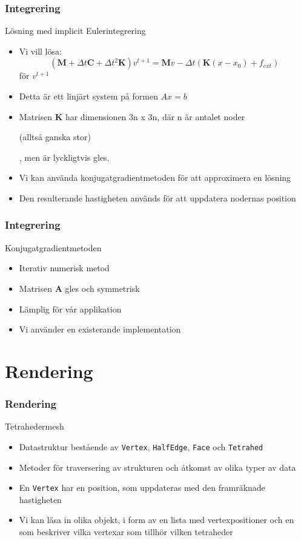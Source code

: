 \documentclass{beamer}
\begin{document}
\begin{frame}
\frametitle{Integrering}
\begin{block}{Lösning med implicit Eulerintegrering}
\begin{itemize}
\item Vi vill lösa:
	\begin{equation}
		(\mathbf{M} + \Delta t  \mathbf{C} + \Delta t^2 \mathbf{K})v^{t+1} = \mathbf{M} v - \Delta t (\mathbf{K}(x - x_0) + f_{ext})
	\end{equation}
för $v^{t+1}$
\item Detta är ett linjärt system på formen $Ax = b$
\item Matrisen $\mathbf{K}$ har dimensionen 3n x 3n, där n är antalet noder \begin{tiny}(alltså ganska stor)\end{tiny}, men är lyckligtvis gles.
\item Vi kan använda konjugatgradientmetoden för att approximera en lösning
\item Den resulterande hastigheten används för att uppdatera nodernas position
\end{itemize}
\end{block}
\end{frame}

\begin{frame}
\frametitle{Integrering}
\begin{block}{Konjugatgradientmetoden}
\begin{itemize}
\item Iterativ numerisk metod
\item Matrisen $\mathbf{A}$ gles och symmetrisk
\item Lämplig för vår applikation
\item Vi använder en existerande implementation
\end{itemize}
\end{block}
\end{frame}

\section{Rendering}
\begin{frame}
\frametitle{Rendering}
\begin{block}{Tetrahedermesh}
\begin{itemize}
\item Datastruktur bestående av \texttt{Vertex}, \texttt{HalfEdge}, \texttt{Face} och \texttt{Tetrahed}
\item Metoder för traversering av strukturen och åtkomst av olika typer av data
\item En \texttt{Vertex} har en position, som uppdateras med den framräknade hastigheten
\item Vi kan läsa in olika objekt, i form av en lista med vertexpositioner och en som beskriver vilka vertexar som tillhör vilken tetraheder

\end{itemize}
\end{block}
\end{frame}
\end{document}
